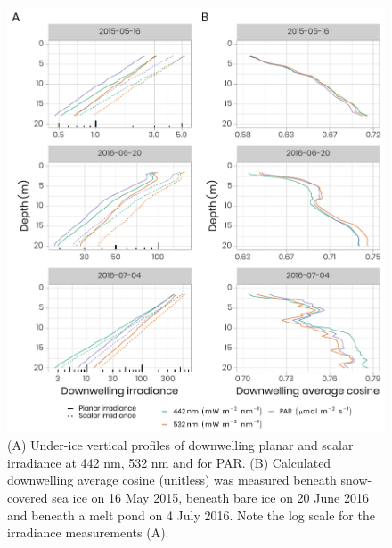 \documentclass[12pt,a4paper]{scrartcl}
\begin{document}
\clearpage
\newpage

\begin{figure}[h]
	\centering
	\includegraphics[scale = 1]{../../../graphs/fig5.pdf}
	\caption{(A) Under-ice vertical profiles of downwelling planar and scalar irradiance at 442 nm, 532 nm and for PAR. (B) Calculated downwelling average cosine (unitless) was measured beneath snow-covered sea ice on 16 May 2015, beneath bare ice on 20 June 2016 and beneath a melt pond on 4 July 2016. Note the log scale for the irradiance measurements (A).}
\end{figure}

\clearpage
\newpage
\end{document}
